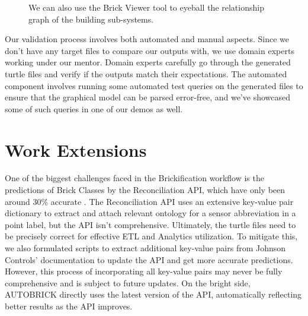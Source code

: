 \documentclass[twocolumn, switch]{article} %
\begin{document}
\begin{figure}[H]
  \centering
  \caption{We can also use the Brick Viewer tool
  \cite{brick_ttl_viewer} to eyeball the relationship graph of the building sub-systems.}
  \label{fig:fig3}
\end{figure}


Our validation process involves both automated and manual aspects. Since we don't have any target files to compare our outputs with, we use domain experts working under our mentor. Domain experts carefully go through the generated turtle files and verify if the outputs match their expectations. The automated component involves running some automated test queries on the generated files to ensure that the graphical model can be parsed error-free, and we’ve showcased some of such queries in one of our demos as well.

\section{Work Extensions}
One of the biggest challenges faced in the Brickification workflow is the
predictions of Brick Classes by the Reconciliation API, which have only been
around 30\% accurate \cite{gtfierro225_2020}. The Reconciliation API uses an extensive key-value pair dictionary to extract and attach relevant ontology for a sensor abbreviation in a point label, but the API isn’t comprehensive. Ultimately, the turtle files need to be precisely correct for effective ETL and Analytics utilization. To mitigate this, we also formulated scripts to extract additional key-value pairs from Johnson Controls’ documentation to update the API and get more accurate predictions. However, this process of incorporating all key-value pairs may never be fully comprehensive and is subject to future updates. On the bright side, AUTOBRICK directly uses the latest version of the API, automatically reflecting better results as the API improves. 
\end{document}
